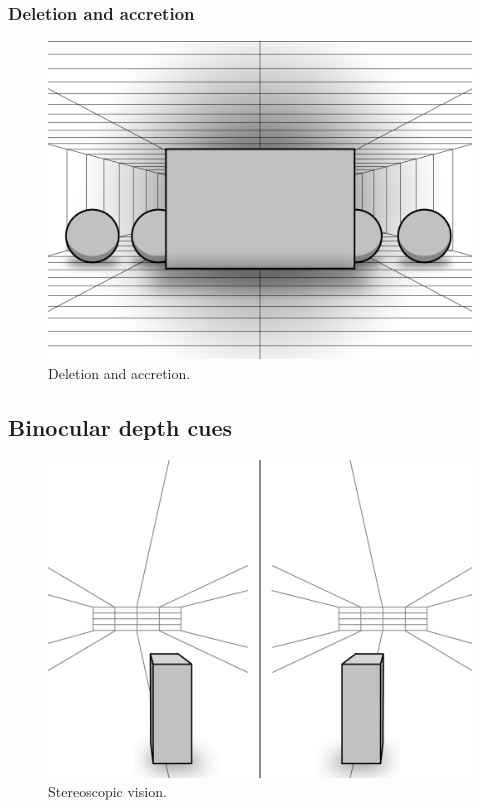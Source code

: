 \subsubsection{Deletion and accretion}
\begin{figure}[H]
	\centering
	\includegraphics[width=1\linewidth]{figure/Analysis/deletionAccretion.png}
	\caption{Deletion and accretion.}
	\label{fig:deletionAccretion}
\end{figure}

\subsection{Binocular depth cues}
\begin{figure}[H]
	\centering
	\includegraphics[width=1\linewidth]{figure/Analysis/stereoScopicVision.png}
	\caption{Stereoscopic vision.}
	\label{fig:stereoscopicVision}
\end{figure}


